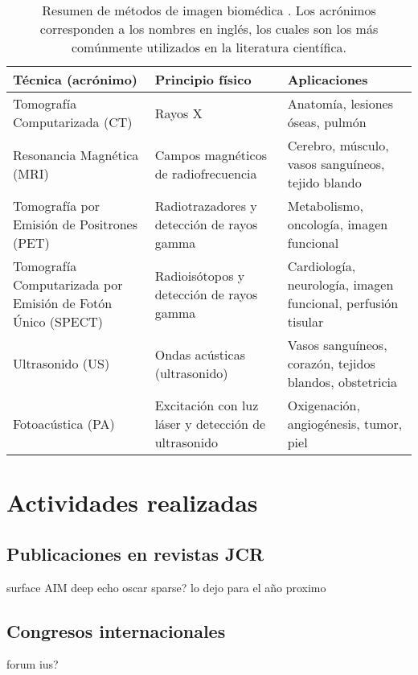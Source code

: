 \documentclass[10pt,a4paper]{article}
\begin{document}
\begin{table}[H]
	\small
	\centering
	\caption{Resumen de métodos de imagen biomédica \cite{Bushberg2021}. Los acrónimos corresponden a los nombres en inglés, los cuales son los más comúnmente utilizados en la literatura científica.} 
	\begin{tabularx}{\textwidth}{X|X|X}
		\\
		\hline
		\textbf{Técnica (acrónimo)} & \textbf{Principio físico} & \textbf{Aplicaciones} \\
		\hline\hline
		Tomografía Computarizada (CT) & Rayos X & Anatomía, lesiones óseas, pulmón \\
		\hline
		Resonancia Magnética (MRI) & Campos magnéticos de radiofrecuencia & Cerebro, músculo, vasos sanguíneos, tejido blando \\
		\hline
		Tomografía por Emisión de Positrones (PET) & Radiotrazadores y detección de rayos gamma & Metabolismo, oncología, imagen funcional \\
		\hline
		Tomografía Computarizada por Emisión de Fotón Único (SPECT) & Radioisótopos y detección de rayos gamma & Cardiología, neurología, imagen funcional, perfusión tisular \\
		\hline
		Ultrasonido (US) & Ondas acústicas (ultrasonido) & Vasos sanguíneos, corazón, tejidos blandos, obstetricia \\
		\hline
		Fotoacústica (PA) & Excitación con luz láser y detección de ultrasonido & Oxigenación, angiogénesis, tumor, piel \\
		\hline
	\end{tabularx}
	\label{tab:metodos-imagen}
\end{table}


\section{Actividades realizadas}\label{sec:actividades}

\subsection{Publicaciones en revistas JCR}\label{sec:publicaciones}
surface AIM
deep echo
oscar sparse? lo dejo para el año proximo 

\subsection{Congresos internacionales}\label{sec:congresos}
forum
ius?
\end{document}
